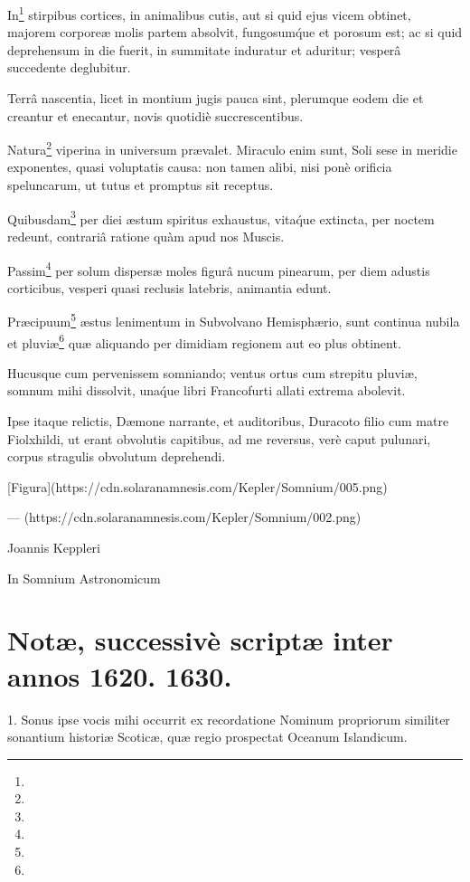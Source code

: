 \documentclass[a4paper, 11pt, oneside, polutonikogreek, german]{article}
\begin{document}
In\footnote{} stirpibus cortices, in animalibus cutis, aut si quid ejus vicem obtinet, majorem corporeæ molis partem absolvit, fungosum\'que et porosum est; ac si quid deprehensum in die fuerit, in summitate induratur et aduritur; vesperâ succedente deglubitur.

Terrâ nascentia, licet in montium jugis pauca sint, plerumque eodem die et creantur et enecantur, novis quotidiè succrescentibus.

Natura\footnote{} viperina in universum prævalet. Miraculo enim sunt, Soli sese in meridie exponentes, quasi voluptatis causa: non tamen alibi, nisi ponè orificia speluncarum, ut tutus et promptus sit receptus.

Quibusdam\footnote{} per diei æstum spiritus exhaustus, vita\'que extincta, per noctem redeunt, contrariâ ratione quàm apud nos Muscis.

Passim\footnote{} per solum dispersæ moles figurâ nucum pinearum, per diem adustis corticibus, vesperi quasi reclusis latebris, animantia edunt.

Præcipuum\footnote{} æstus lenimentum in Subvolvano Hemisphærio, sunt continua nubila et pluviæ\footnote{} quæ aliquando per dimidiam regionem aut eo plus obtinent.

Hucusque cum pervenissem somniando; ventus ortus cum strepitu pluviæ, somnum mihi dissolvit, una\'que libri Francofurti allati extrema abolevit.

Ipse itaque relictis, Dæmone narrante, et auditoribus, Duracoto filio cum matre Fiolxhildi, ut erant obvolutis capitibus, ad me reversus, verè caput pulunari, corpus stragulis obvolutum deprehendi.

[Figura](https://cdn.solaranamnesis.com/Kepler/Somnium/005.png)

---
\clearpage
[Figura](https://cdn.solaranamnesis.com/Kepler/Somnium/002.png)

Joannis Keppleri

In Somnium Astronomicum

\section{Notæ, successivè scriptæ inter annos 1620. 1630.}

1. Sonus ipse vocis mihi occurrit ex recordatione Nominum propriorum similiter sonantium historiæ Scoticæ, quæ regio prospectat Oceanum Islandicum.
\end{document}
